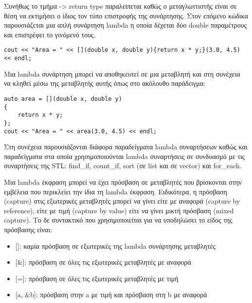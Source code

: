 Συνήθως το τμήμα -> return type παραλείπεται καθώς ο μεταγλωττιστής είναι σε θέση να εκτιμήσει ο ίδιος τον τύπο επιστροφής της συνάρτησης. Στον επόμενο κώδικα παρουσιάζεται μια απλή συνάρτηση lambda η οποία δέχεται δύο double παραμέτρους και επιστρέφει το γινόμενό τους.

\begin{lstlisting}[style=DOS]
cout << "Area = " << [](double x, double y){return x * y;}(3.0, 4.5) << endl;
\end{lstlisting}

Μια lambda συνάρτηση μπορεί να αποθηκευτεί σε μια μεταβλητή και στη συνέχεια να κληθεί μέσω της μεταβλητής αυτής όπως στο ακόλουθο παράδειγμα:

\begin{lstlisting}[style=DOS]
auto area = [](double x, double y)
{
	return x * y;
};
cout << "Area = " << area(3.0, 4.5) << endl;
\end{lstlisting}

Στη συνέχεια παρουσιάζονται διάφορα παραδείγματα lambda συναρτήσεων καθώς και παραδείγματα στα οποία χρησιμοποιούνται lambda συναρτήσεις σε συνδυασμό με τις συναρτήσεις της STL: find\_if, count\_if, sort (σε list και σε vector) και for\_each.





Μια lambda έκφραση μπορεί να έχει πρόσβαση σε μεταβλητές που βρίσκονται στην εμβέλεια που περικλείει την ίδια τη lambda έκφραση. Ειδικότερα, η πρόσβαση (capture) στις εξωτερικές μεταβλητές μπορεί να γίνει είτε με αναφορά (capture by reference), είτε με τιμή (capture by value) είτε να γίνει μικτή πρόσβαση (mixed capture). Το δε συντακτικό που χρησιμοποιείται για να υποδηλώσει το είδος της πρόσβασης είναι:

\begin{itemize}[noitemsep]
\item {[]}: καμία πρόσβαση σε εξωτερικές της lambda συνάρτησης μεταβλητές
\item {[\&]}: πρόσβαση σε όλες τις εξωτερικές μεταβλητές με αναφορά
\item {[=]}: πρόσβαση σε όλες τις εξωτερικές μεταβλητές με τιμή
\item {[a, \&b]}: πρόσβαση στην a με τιμή και πρόσβαση στη b με αναφορά
\end{itemize}



